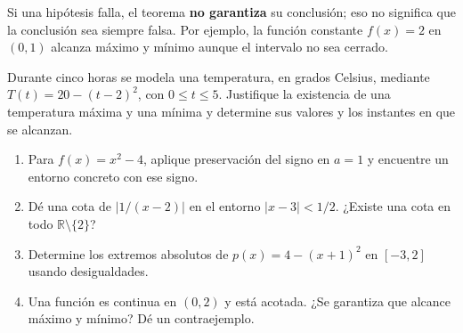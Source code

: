 \documentclass[10pt,a5paper]{article}
\newif\ifmostrarSoluciones
\begin{document}
\begin{nota}
Si una hipótesis falla, el teorema \textbf{no garantiza} su conclusión; eso no significa que la conclusión sea siempre falsa. Por ejemplo, la función constante $f(x)=2$ en $(0,1)$ alcanza máximo y mínimo aunque el intervalo no sea cerrado.
\end{nota}

\begin{ejemplo}
Durante cinco horas se modela una temperatura, en grados Celsius, mediante $T(t)=20-(t-2)^2$, con $0\leq t\leq5$. Justifique la existencia de una temperatura máxima y una mínima y determine sus valores y los instantes en que se alcanzan.
\end{ejemplo}
\ifmostrarSoluciones
\begin{solucion}
$T$ es polinómica y continua en $[0,5]$, así que el teorema garantiza ambos extremos. En ese intervalo, $-2\leq t-2\leq3$, de donde $0\leq(t-2)^2\leq9$. Así, $11\leq T(t)\leq20$. La máxima es $20\,{}^\circ\mathrm{C}$ en $t=2$; la mínima es $11\,{}^\circ\mathrm{C}$ en $t=5$.
\end{solucion}
\else\vspace{20mm}\fi

\begin{ejercicios}
\begin{enumerate}
  \item Para $f(x)=x^2-4$, aplique preservación del signo en $a=1$ y encuentre un entorno concreto con ese signo.
  \item Dé una cota de $|1/(x-2)|$ en el entorno $|x-3|<1/2$. ¿Existe una cota en todo $\mathbb{R}\setminus\{2\}$?
  \item Determine los extremos absolutos de $p(x)=4-(x+1)^2$ en $[-3,2]$ usando desigualdades.
  \item Una función es continua en $(0,2)$ y está acotada. ¿Se garantiza que alcance máximo y mínimo? Dé un contraejemplo.
\end{enumerate}
\end{ejercicios}
\ifmostrarSoluciones
\begin{solucion}[de la clase 2]
\begin{enumerate}
  \item Es continua y $f(1)=-3<0$. Por ejemplo, $|x-1|<1/2$ implica $1/2<x<3/2$ y $f(x)<0$.
  \item En ese entorno, $1/2<x-2<3/2$, por lo que $|1/(x-2)|<2$. No hay cota global, pues la función crece sin cota cuando $x\to2^+$.
  \item Como $-2\leq x+1\leq3$, se tiene $-5\leq p(x)\leq4$. El máximo es $4$ en $x=-1$ y el mínimo es $-5$ en $x=2$.
  \item No. La función $f(x)=x$ en $(0,2)$ es continua y acotada, pero no alcanza ninguno de los dos extremos absolutos.
\end{enumerate}
\end{solucion}
\fi
\end{document}
